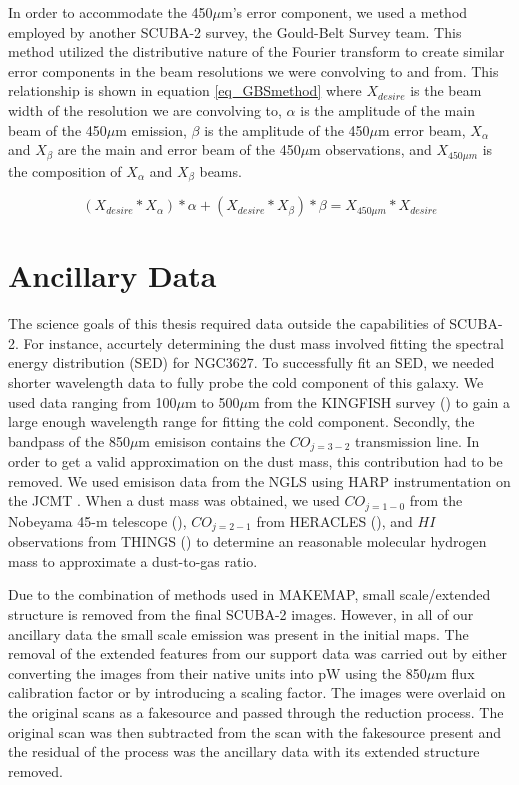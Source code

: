 In order to accommodate the 450$\mu$m's error component, we used a method employed by another SCUBA-2 survey, the Gould-Belt Survey team.  This method utilized the distributive nature of the Fourier transform to create similar error components in the beam resolutions we were convolving to and from.  This relationship is shown in equation \ref{eq_GBSmethod} where $X_{desire}$ is the beam width of the resolution we are convolving to, $\alpha$ is the amplitude of the main beam of the 450$\mu$m emission, $\beta$ is the amplitude of the 450$\mu$m error beam, $X_{\alpha}$ and $X_{\beta}$ are the main and error beam of the 450$\mu$m observations, and $X_{450\mu m}$ is the composition of $X_{\alpha}$ and $X_{\beta}$ beams.

\begin{equation} \label{eq_GBSmethod}
  \left(X_{desire} \ast X_{\alpha}\right)*\alpha + \left(X_{desire} \ast X_{\beta}\right)*\beta = X_{450\mu m} \ast X_{desire}
\end{equation}

\section{Ancillary Data}

The science goals of this thesis required data outside the capabilities of SCUBA-2.  For instance, accurtely determining the dust mass involved fitting the spectral energy distribution (SED) for NGC3627.  To successfully fit an SED, we needed shorter wavelength data to fully probe the cold component of this galaxy. We used data ranging from 100$\mu$m to 500$\mu$m from the KINGFISH survey (\citep{kennicutt2011}) to gain a large enough wavelength range for fitting the cold component.  Secondly, the bandpass of the 850$\mu$m emisison contains the $CO_{j=3-2}$ transmission line.  In order to get a valid approximation on the dust mass, this contribution had to be removed.  We used emisison data from the NGLS using HARP instrumentation on the JCMT \citep{wilson2012}.  When a dust mass was obtained, we used $CO_{j=1-0}$ from the Nobeyama 45-m telescope (\citep{kuno2007}), $CO_{j=2-1}$ from HERACLES (\citep{leroy2009}), and $HI$ observations from THINGS (\citep{walter2008}) to determine an reasonable molecular hydrogen mass to approximate a dust-to-gas ratio.

Due to the combination of methods used in MAKEMAP, small scale/extended structure is removed from the final SCUBA-2 images.  However, in all of our ancillary data the small scale emission was present in the initial maps.  The removal of the extended features from our support data was carried out by either converting the images from their native units into pW using the 850$\mu$m flux calibration factor or by introducing a scaling factor.  The images were overlaid on the original scans as a fakesource and passed through the reduction process.  The original scan was then subtracted from the scan with the fakesource present and the residual of the process was the ancillary data with its extended structure removed.


